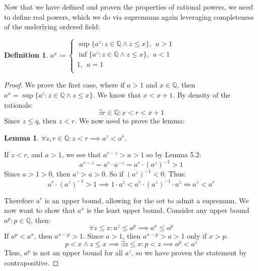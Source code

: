 \documentclass{article}
\newtheorem{lem}{Lemma}[section]
\newtheorem{defn}{Definition}[section]
\begin{document}
\medskip
Now that we have defined and proven the properties of rational powers, we need to define real powers, which we do via supremums again leveraging completeness of the underlying ordered field:
\begin{defn}
$a^x \coloneq \begin{cases}
    \sup\{a^z: z \in \mathbb{Q} \land z \leqslant x\}, \ \ a > 1\\
    \inf\{a^z: z \in \mathbb{Q} \land z \leqslant x\}, \ \ a < 1\\
    1, \ \ a = 1\\
\end{cases}$
\end{defn}
\begin{proof}
We prove the first case, where if $a > 1$ and $x \in \mathbb{Q}$, then $a^x = \sup\{a^z: z \in \mathbb{Q} \land z \leqslant x\}$. We know that $x < x+1$. By density of the rationals:
\begin{equation*}
  \exists r \in \mathbb{Q}: x < r < x+1  
\end{equation*}
Since $z \leqslant q$, then $z < r$. We now need to prove the lemma:
\begin{lem}
$\forall z, r \in \mathbb{Q}: z < r \implies a^z < a^r$. 
\end{lem}
If $z < r$, and $a > 1$, we see that $a^{r-z} > a > 1$ so by Lemma 5.2:
\begin{equation*}
    a^{r-z} = a^r \cdot a^{-z} = a^r \cdot (a^z)^{-1} > 1
\end{equation*}
Since $a > 1 > 0$, then $a^z > a > 0$. So if $(a^z)^{-1} < 0$. Thus:
\begin{equation*}
    a^r \cdot (a^z)^{-1} > 1 \implies 1 \cdot a^z < a^r \cdot (a^z)^{-1} \cdot a^z \iff a^z < a^r
\end{equation*}

Therefore $a^r$ is an upper bound, allowing for the set to admit a supremum. We now want to show that $a^x$ is the least upper bound. Consider any upper bound $a^p: p \in \mathbb{Q}$, then:
\begin{equation*}
    \forall z \leqslant x: a^z \leqslant a^p \implies a^x \leqslant a^p
\end{equation*}
If $a^p < a^x$, then $a^{x-p} > 1$. Since $a > 1$, then $a^{x-p} > a > 1$ only if $x > p$.
\begin{equation*}
    p < x \land z \leqslant x \implies \exists z \leqslant x: p < z \implies a^p < a^z
\end{equation*}
Thus, $a^p$ is not an upper bound for all $a^z$, so we have proven the statement by contrapositive.


\end{proof}
\end{document}
